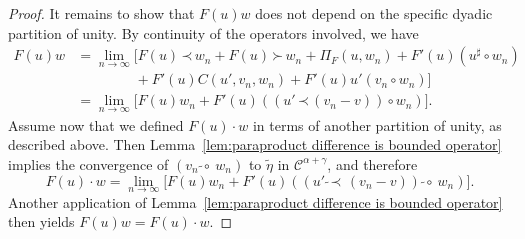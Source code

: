 \documentclass[a4paper,11pt]{article}
\theoremstyle{remark}
\newcommand{\CC}{\ensuremath{\mathscr{C}}}
\newcommand{\lpara}{\,\mathord{\prec}\,}
\newcommand{\rpara}{\,\mathord{\succ}\,}
\newcommand{\reso}{\,\mathord{\circ}\,}
\begin{document}
\begin{proof}
  It remains to show that $F(u) w$ does not depend on the specific dyadic partition of unity. By continuity of the operators involved, we have
  \begin{align*}
     F(u) w & = \lim_{n \to \infty} \Big[ F ( u ) \lpara w_n + F ( u ) \rpara w_n + \Pi_{F} ( u,w_n ) +F' ( u ) (u^\sharp \reso w_n) \\
     &\hspace{50pt} +F'(u) C(u', v_n, w_n) + F'(u) u' (v_n \reso w_n) \Big] \\
     & = \lim_{n \to \infty} \Big[ F(u) w_n + F'(u) ((u' \lpara (v_n - v)) \reso w_n) \Big].
  \end{align*}
  Assume now that we defined $F(u) \cdot w$ in terms of another partition of unity, as described above. Then Lemma~\ref{lem:paraproduct difference is bounded operator} implies the convergence of $(v_n \ \widetilde \reso \ w_n)$ to $\tilde \eta$ in $\CC^{\alpha+\gamma}$, and therefore
  \[
     F(u) \cdot w = \lim_{n \to \infty} \Big[ F(u) w_n + F'(u) ((u' \ \widetilde \lpara \ (v_n - v)) \ \widetilde \reso \ w_n) \Big].
  \]
  Another application of Lemma~\ref{lem:paraproduct difference is bounded operator} then yields $F(u) w = F(u) \cdot w$.
%  
%  
%  
%  
%  
%  
%  
%  

\end{proof}
\end{document}
